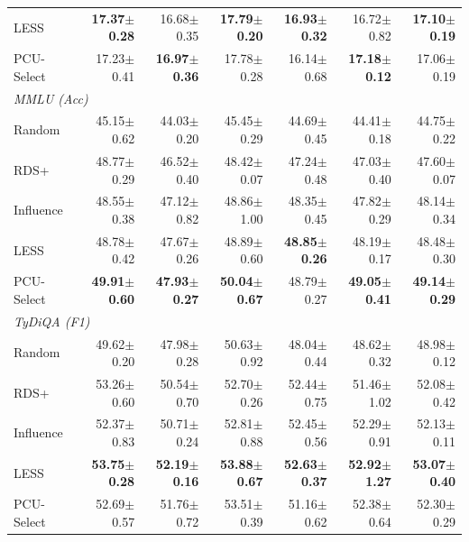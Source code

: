 \begin{table}[t]
\begin{tabular}{lrrrrrr}
LESS & \textbf{17.37{\scriptsize$\pm$0.28}} & 16.68{\scriptsize$\pm$0.35} & \textbf{17.79{\scriptsize$\pm$0.20}} & \textbf{16.93{\scriptsize$\pm$0.32}} & 16.72{\scriptsize$\pm$0.82} & \textbf{17.10{\scriptsize$\pm$0.19}} \\
PCU-Select & 17.23{\scriptsize$\pm$0.41} & \textbf{16.97{\scriptsize$\pm$0.36}} & 17.78{\scriptsize$\pm$0.28} & 16.14{\scriptsize$\pm$0.68} & \textbf{17.18{\scriptsize$\pm$0.12}} & 17.06{\scriptsize$\pm$0.19} \\
\midrule
\multicolumn{7}{l}{\textit{MMLU (Acc)}} \\
Random & 45.15{\scriptsize$\pm$0.62} & 44.03{\scriptsize$\pm$0.20} & 45.45{\scriptsize$\pm$0.29} & 44.69{\scriptsize$\pm$0.45} & 44.41{\scriptsize$\pm$0.18} & 44.75{\scriptsize$\pm$0.22} \\
RDS+ & 48.77{\scriptsize$\pm$0.29} & 46.52{\scriptsize$\pm$0.40} & 48.42{\scriptsize$\pm$0.07} & 47.24{\scriptsize$\pm$0.48} & 47.03{\scriptsize$\pm$0.40} & 47.60{\scriptsize$\pm$0.07} \\
Influence & 48.55{\scriptsize$\pm$0.38} & 47.12{\scriptsize$\pm$0.82} & 48.86{\scriptsize$\pm$1.00} & 48.35{\scriptsize$\pm$0.45} & 47.82{\scriptsize$\pm$0.29} & 48.14{\scriptsize$\pm$0.34} \\
LESS & 48.78{\scriptsize$\pm$0.42} & 47.67{\scriptsize$\pm$0.26} & 48.89{\scriptsize$\pm$0.60} & \textbf{48.85{\scriptsize$\pm$0.26}} & 48.19{\scriptsize$\pm$0.17} & 48.48{\scriptsize$\pm$0.30} \\
PCU-Select & \textbf{49.91{\scriptsize$\pm$0.60}} & \textbf{47.93{\scriptsize$\pm$0.27}} & \textbf{50.04{\scriptsize$\pm$0.67}} & 48.79{\scriptsize$\pm$0.27} & \textbf{49.05{\scriptsize$\pm$0.41}} & \textbf{49.14{\scriptsize$\pm$0.29}} \\
\midrule
\multicolumn{7}{l}{\textit{TyDiQA (F1)}} \\
Random & 49.62{\scriptsize$\pm$0.20} & 47.98{\scriptsize$\pm$0.28} & 50.63{\scriptsize$\pm$0.92} & 48.04{\scriptsize$\pm$0.44} & 48.62{\scriptsize$\pm$0.32} & 48.98{\scriptsize$\pm$0.12} \\
RDS+ & 53.26{\scriptsize$\pm$0.60} & 50.54{\scriptsize$\pm$0.70} & 52.70{\scriptsize$\pm$0.26} & 52.44{\scriptsize$\pm$0.75} & 51.46{\scriptsize$\pm$1.02} & 52.08{\scriptsize$\pm$0.42} \\
Influence & 52.37{\scriptsize$\pm$0.83} & 50.71{\scriptsize$\pm$0.24} & 52.81{\scriptsize$\pm$0.88} & 52.45{\scriptsize$\pm$0.56} & 52.29{\scriptsize$\pm$0.91} & 52.13{\scriptsize$\pm$0.11} \\
LESS & \textbf{53.75{\scriptsize$\pm$0.28}} & \textbf{52.19{\scriptsize$\pm$0.16}} & \textbf{53.88{\scriptsize$\pm$0.67}} & \textbf{52.63{\scriptsize$\pm$0.37}} & \textbf{52.92{\scriptsize$\pm$1.27}} & \textbf{53.07{\scriptsize$\pm$0.40}} \\
PCU-Select & 52.69{\scriptsize$\pm$0.57} & 51.76{\scriptsize$\pm$0.72} & 53.51{\scriptsize$\pm$0.39} & 51.16{\scriptsize$\pm$0.62} & 52.38{\scriptsize$\pm$0.64} & 52.30{\scriptsize$\pm$0.29} \\
\bottomrule
\end{tabular}
\end{table}
